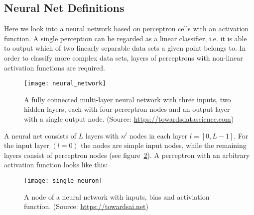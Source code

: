 \subsection{Neural Net Definitions}

Here we look into a neural network based on perceptron cells with an activation function.
A single perception can be regarded as a linear classifier, i.e. it is able to output
which of two linearly separable data sets a given point belongs to. In order to classify
more complex data sets, layers of perceptrons with non-linear activation functions are
required.

\begin{figure}[h] \centering \texttt{[image: neural\_network]}
    \caption{A fully connected multi-layer neural network with three inputs, two hidden
    layers, each with four perceptron nodes and an output layer with a single output node.
    (Source: \url{https://towardsdatascience.com})} \label{fig:neural_network}
\end{figure}

A neural net consists of $L$ layers with $n^l$ nodes in each layer $l=[0,L-1]$. For the
input layer $(l=0)$ the nodes are simple input nodes, while the remaining layers consist
of perceptron nodes (see figure~\ref{fig:perceptron}). A perceptron with an arbitrary
activation function looks like this:
\begin{figure}[h] \centering \texttt{[image: single\_neuron]}
    \caption{A node of a neural network with inputs, bias and activiation function.
    (Source: \url{https://towardsai.net})}
    \label{fig:perceptron}
\end{figure}

